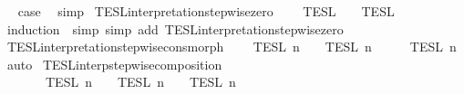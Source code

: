 \begin{isabellebody}
\isamarkupfalse%
\ \isamarkupfalse%
\ {\isacharquery}case\ \isamarkupfalse%
\ simp\isanewline
{}\isamarkupfalse%
%
\endisatagproof
{\isafoldproof}%
%
\isadelimproof
\isanewline
%
\endisadelimproof
\isanewline
{}\isamarkupfalse%
\ TESL{\isacharunderscore}interpretation{\isacharunderscore}stepwise{\isacharunderscore}zero{\isacharprime}{\isacharcolon}\isanewline
\ \ {\isacartoucheopen}{\isasymlbrakk}{\isasymlbrakk}\ {\isasymPhi}\ {\isasymrbrakk}{\isasymrbrakk}\isactrlsub T\isactrlsub E\isactrlsub S\isactrlsub L\ {\isacharequal}\ {\isasymlbrakk}{\isasymlbrakk}\ {\isasymPhi}\ {\isasymrbrakk}{\isasymrbrakk}\isactrlsub T\isactrlsub E\isactrlsub S\isactrlsub L\isactrlbsup {\isasymge}\ {}\isactrlesup {\isacartoucheclose}\isanewline
%
\isadelimproof
%
\endisadelimproof
%
\isatagproof
{}\isamarkupfalse%
\ {\isacharparenleft}induction\ {\isasymPhi}{\isacharcomma}\ simp{\isacharcomma}\ simp\ add{\isacharcolon}\ TESL{\isacharunderscore}interpretation{\isacharunderscore}stepwise{\isacharunderscore}zero{\isacharparenright}%
\endisatagproof
{\isafoldproof}%
%
\isadelimproof
\isanewline
%
\endisadelimproof
\isanewline
{}\isamarkupfalse%
\ TESL{\isacharunderscore}interpretation{\isacharunderscore}stepwise{\isacharunderscore}cons{\isacharunderscore}morph{\isacharcolon}\isanewline
\ \ {\isacartoucheopen}{\isasymlbrakk}\ {\isasymphi}\ {\isasymrbrakk}\isactrlsub T\isactrlsub E\isactrlsub S\isactrlsub L\isactrlbsup {\isasymge}\ n\isactrlesup \ {\isasyminter}\ {\isasymlbrakk}{\isasymlbrakk}\ {\isasymPhi}\ {\isasymrbrakk}{\isasymrbrakk}\isactrlsub T\isactrlsub E\isactrlsub S\isactrlsub L\isactrlbsup {\isasymge}\ n\isactrlesup \ {\isacharequal}\ {\isasymlbrakk}{\isasymlbrakk}\ {\isasymphi}\ {\isacharhash}\ {\isasymPhi}\ {\isasymrbrakk}{\isasymrbrakk}\isactrlsub T\isactrlsub E\isactrlsub S\isactrlsub L\isactrlbsup {\isasymge}\ n\isactrlesup {\isacartoucheclose}\isanewline
%
\isadelimproof
%
\endisadelimproof
%
\isatagproof
{}\isamarkupfalse%
\ auto%
\endisatagproof
{\isafoldproof}%
%
\isadelimproof
\isanewline
%
\endisadelimproof
\isanewline
{}\isamarkupfalse%
\ TESL{\isacharunderscore}interp{\isacharunderscore}stepwise{\isacharunderscore}composition{\isacharcolon}\isanewline
\ \ \ {\isacartoucheopen}{\isasymlbrakk}{\isasymlbrakk}\ {\isasymPhi}\ {\isacharat}\ {\isasymPhi}\ {\isasymrbrakk}{\isasymrbrakk}\isactrlsub T\isactrlsub E\isactrlsub S\isactrlsub L\isactrlbsup {\isasymge}\ n\isactrlesup \ {\isacharequal}\ {\isasymlbrakk}{\isasymlbrakk}\ {\isasymPhi}\ {\isasymrbrakk}{\isasymrbrakk}\isactrlsub T\isactrlsub E\isactrlsub S\isactrlsub L\isactrlbsup {\isasymge}\ n\isactrlesup \ {\isasyminter}\ {\isasymlbrakk}{\isasymlbrakk}\ {\isasymPhi}\ {\isasymrbrakk}{\isasymrbrakk}\isactrlsub T\isactrlsub E\isactrlsub S\isactrlsub L\isactrlbsup {\isasymge}\ n\isactrlesup {\isacartoucheclose}\isanewline

\end{isabellebody}
